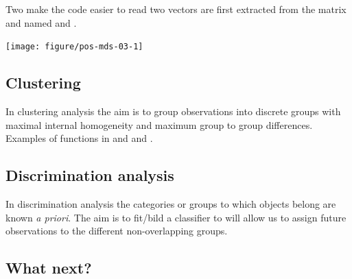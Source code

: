 \documentclass[krantz2]{krantz}\usepackage{knitr}%
\begin{document}
Two make the code easier to read two vectors are first extracted from the matrix and named  and .
\begin{knitrout}\footnotesize
{}\color{fgcolor}\begin{kframe}
\begin{alltt}
 \hlkwb{<-} \hlstd{loc[,} \hlstd{]}
 \hlkwb{<-} \hlopt{-}\hlstd{loc[,} \hlstd{]} 
  \hlstd{=} \hlstd{,}  \hlstd{=} \hlstd{,}  \hlstd{=} \hlstd{,}  \hlstd{=} \hlstd{,}  \hlstd{=} \hlstd{,}
      \hlstd{=} \hlstd{)}
   \hlstd{=} \hlstd{)}
\end{alltt}
\end{kframe}

{\centering \texttt{[image: figure/pos-mds-03-1]} 

}



\end{knitrout}

\subsection{Clustering}\label{sec:stat:cluster}

In clustering analysis the aim is to group observations into discrete groups with maximal internal homogeneity and maximum group to group differences. Examples of functions in \Rlang and  and .

\subsection{Discrimination analysis}\label{sec:stat:DA}

In discrimination analysis the categories or groups to which objects belong are known \emph{a priori}. The aim is to fit/bild a classifier to will allow us to assign future observations to the different non-overlapping groups.

\subsection{What next?}
\end{document}

